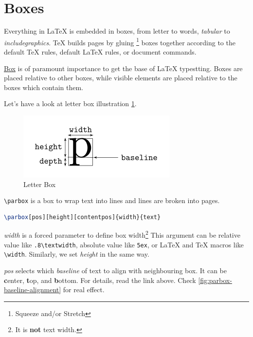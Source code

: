 \section{Boxes}
\label{sec:boxes}

Everything in \LaTeX{} is embedded in boxes, from letter to words,
\textit{tabular} to \textit{includegraphics}. TeX builds pages by
gluing \footnote{Squeeze and/or Stretch} boxes together according
to the default \TeX{} rules, default \LaTeX{} rules, or document
commands.

\href{https://en.wikibooks.org/wiki/LaTeX/Boxes}{Box} is of
paramount importance to get the base of \LaTeX{} typestting. Boxes
are placed relative to other boxes, while visible elements are
placed relative to the boxes which contain them.

Let's have a look at letter box illustration \ref{fig:letter-box}.

\begin{figure}[!htb]
  \centering
  \includegraphics[width=.5\textwidth]{letter_box}
  \caption{Letter Box}
  \label{fig:letter-box}
\end{figure}

\verb|\parbox| is a box to wrap text into lines and lines are
broken into pages.

\begin{lstlisting}[language=TeX,caption={parbox box},label={lst:parbox-box}]
\parbox[pos][height][contentpos]{width}{text}
\end{lstlisting}

\textit{width} is a forced parameter to define box
width\footnote{It is \textbf{not} text width.} This argument can
be relative value like \verb|.8\textwidth|, absolute value like
\verb|5ex|, or \LaTeX{} and \TeX{} macros like
\verb|\width|. Similarly, we set \textit{height} in the same way.

\textit{pos} selects which \textit{baseline} of text to align with
neighbouring box. It can be \textbf{c}enter, \textbf{t}op, and
\textbf{b}ottom. For details, read the link above. Check
\ref{fig:parbox-baseline-alignment} for real effect.


